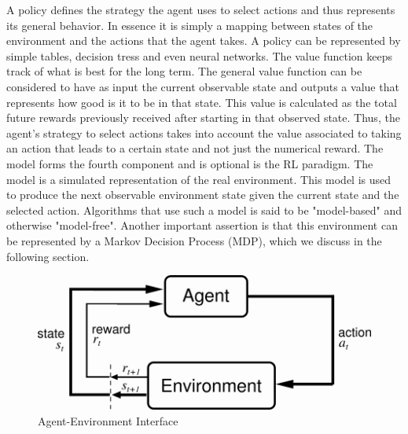 \documentclass[12pt]{extarticle}
\numberwithin{equation}{section}
\begin{document}
	A policy defines the strategy the agent uses to select actions and thus represents its general behavior. In essence it is simply a mapping between states of the environment and the actions that the agent takes. A policy can be represented by simple tables, decision tress and even neural networks. The value function keeps track of what is best for the long term. The general value function can be considered to have as input the current observable state and outputs a value that represents how good is it to be in that state. This value is calculated as the total future rewards previously received after starting in that observed state. Thus, the agent's strategy to select actions takes into account the value associated to taking an action that leads to a certain state and not just the numerical reward. The model forms the fourth component and is optional is the RL paradigm. The model is a simulated representation of the real environment. This model is used to produce the next observable environment state given the current state and the selected action. Algorithms that use such a model is said to be "model-based" and otherwise "model-free". Another important assertion is that this environment can be represented by a Markov Decision Process (MDP), which we discuss in the following section.
	\begin{figure}[H]
		\includegraphics[scale=1]{agent-env-rl}
		\centering
		\caption{Agent-Environment Interface \cite{Sutton-introRL}
			\label{agent-env-rl}}
	\end{figure}
\end{document}
